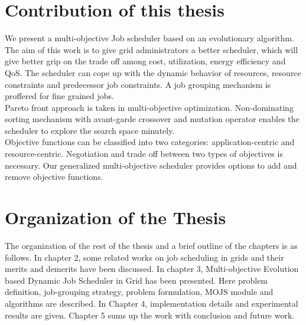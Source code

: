 \section{Contribution of this thesis}
We present a multi-objective Job scheduler based on an evolutionary algorithm. The aim of this work is to give grid administrators a better scheduler, which will give better grip on the trade off among cost, utilization, energy efficiency and QoS. The scheduler can cope up with the dynamic behavior of resources, resource constraints and predecessor job constraints. A job grouping mechanism is proffered for fine grained jobs. \\
Pareto front approach is taken in multi-objective optimization. Non-dominating sorting mechanism with avant-garde crossover and mutation operator enables the scheduler to explore the search space minutely.\\
Objective functions can be classified into two categories: application-centric and resource-centric. Negotiation and trade off between two types of objectives is necessary. Our generalized multi-objective scheduler provides options to add and remove objective functions.
\section{Organization of the Thesis}
The organization of the rest of the thesis and a brief outline of the chapters
is as follows.
In chapter 2, some related works on job scheduling in grids and their merits and demerits have been discussed.
In chapter 3, Multi-objective Evolution based Dynamic Job Scheduler in Grid has been presented. Here problem definition, job-grouping strategy, problem formulation, MOJS module and algorithms are described.
In Chapter 4, implementation details and experimental results are given.
Chapter 5 sums up the work with conclusion and future work.